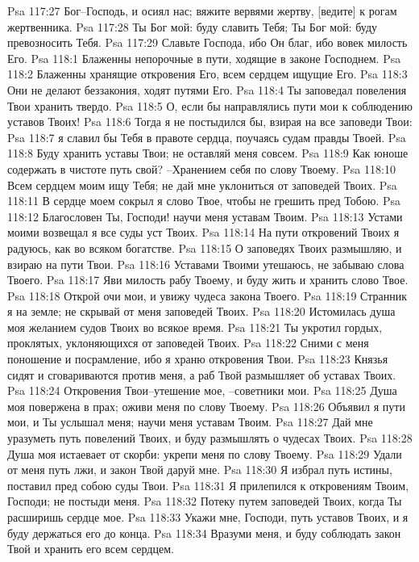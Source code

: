 Psa 117:27  Бог--Господь, и осиял нас; вяжите вервями жертву, [ведите] к рогам жертвенника.
Psa 117:28  Ты Бог мой: буду славить Тебя; Ты Бог мой: буду превозносить Тебя.
Psa 117:29  Славьте Господа, ибо Он благ, ибо вовек милость Его.
Psa 118:1  Блаженны непорочные в пути, ходящие в законе Господнем.
Psa 118:2  Блаженны хранящие откровения Его, всем сердцем ищущие Его.
Psa 118:3  Они не делают беззакония, ходят путями Его.
Psa 118:4  Ты заповедал повеления Твои хранить твердо.
Psa 118:5  О, если бы направлялись пути мои к соблюдению уставов Твоих!
Psa 118:6  Тогда я не постыдился бы, взирая на все заповеди Твои:
Psa 118:7  я славил бы Тебя в правоте сердца, поучаясь судам правды Твоей.
Psa 118:8  Буду хранить уставы Твои; не оставляй меня совсем.
Psa 118:9  Как юноше содержать в чистоте путь свой? --Хранением себя по слову Твоему.
Psa 118:10  Всем сердцем моим ищу Тебя; не дай мне уклониться от заповедей Твоих.
Psa 118:11  В сердце моем сокрыл я слово Твое, чтобы не грешить пред Тобою.
Psa 118:12  Благословен Ты, Господи! научи меня уставам Твоим.
Psa 118:13  Устами моими возвещал я все суды уст Твоих.
Psa 118:14  На пути откровений Твоих я радуюсь, как во всяком богатстве.
Psa 118:15  О заповедях Твоих размышляю, и взираю на пути Твои.
Psa 118:16  Уставами Твоими утешаюсь, не забываю слова Твоего.
Psa 118:17  Яви милость рабу Твоему, и буду жить и хранить слово Твое.
Psa 118:18  Открой очи мои, и увижу чудеса закона Твоего.
Psa 118:19  Странник я на земле; не скрывай от меня заповедей Твоих.
Psa 118:20  Истомилась душа моя желанием судов Твоих во всякое время.
Psa 118:21  Ты укротил гордых, проклятых, уклоняющихся от заповедей Твоих.
Psa 118:22  Сними с меня поношение и посрамление, ибо я храню откровения Твои.
Psa 118:23  Князья сидят и сговариваются против меня, а раб Твой размышляет об уставах Твоих.
Psa 118:24  Откровения Твои--утешение мое, --советники мои.
Psa 118:25  Душа моя повержена в прах; оживи меня по слову Твоему.
Psa 118:26  Объявил я пути мои, и Ты услышал меня; научи меня уставам Твоим.
Psa 118:27  Дай мне уразуметь путь повелений Твоих, и буду размышлять о чудесах Твоих.
Psa 118:28  Душа моя истаевает от скорби: укрепи меня по слову Твоему.
Psa 118:29  Удали от меня путь лжи, и закон Твой даруй мне.
Psa 118:30  Я избрал путь истины, поставил пред собою суды Твои.
Psa 118:31  Я прилепился к откровениям Твоим, Господи; не постыди меня.
Psa 118:32  Потеку путем заповедей Твоих, когда Ты расширишь сердце мое.
Psa 118:33  Укажи мне, Господи, путь уставов Твоих, и я буду держаться его до конца.
Psa 118:34  Вразуми меня, и буду соблюдать закон Твой и хранить его всем сердцем.
